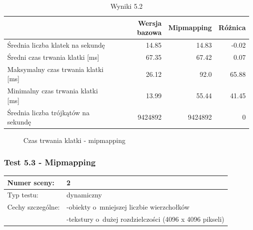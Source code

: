 \documentclass[a4paper,twoside,12pt]{book}
\begin{document}
\vbox{}

\begin{table}[H]
    \centering
    \caption{Wyniki 5.2}
    \label{tab:mip_test2}
    \begin{tabular}{|l||r|r|r|}
        \hline
        & Wersja bazowa & Mipmapping & Różnica \\
        \hline
        Średnia liczba klatek na sekundę & 14.85 & 14.83 & -0.02 \\
        \hline
        Średni czas trwania klatki [ms] & 67.35 & 67.42 & 0.07 \\
        \hline
        Maksymalny czas trwania klatki [ms] & 26.12 & 92.0 & 65.88 \\
        \hline
        Minimalny czas trwania klatki [ms] & 13.99 & 55.44 & 41.45 \\
        \hline
        Średnia liczba trójkątów na sekundę & 9424892 & 9424892 & 0 \\
        \hline
    \end{tabular}
\end{table}

\vbox{}

\begin{figure}[H]
\centering
{}

\caption{Czas trwania klatki - mipmapping}
\label{fig:dynamic_plot_mip2_met}
\end{figure}

\vbox{}

\subsubsection{Test 5.3 - Mipmapping}
\begin{tabular}{|l||l|}
\hline
Numer sceny: & 2 \\
\hline
Typ testu: & dynamiczny \\
\hline
Cechy szczególne: & -obiekty o~mniejszej liczbie wierzchołków \\
& -tekstury o~dużej rozdzielczości (4096 x 4096 pikseli) \\
\hline
\end{tabular}\\
\end{document}
